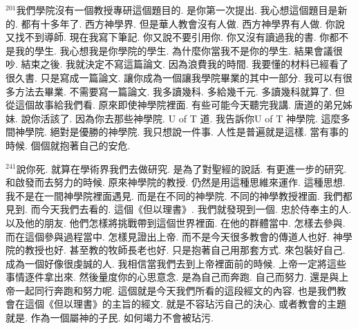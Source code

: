 \documentclass{book}
\begin{document}
$^{201}$我們學院沒有一個教授專研這個題目的.
是你第一次提出.
我心想這個題目是新的.
都有十多年了.
西方神學界.
但是華人教會沒有人做.
西方神學界有人做.
你說又找不到導師.
現在我寫下筆記.
你又說不要引用你.
你又沒有讀過我的書.
你都不是我的學生.
我心想我是你學院的學生.
為什麼你當我不是你的學生.
結果會議很吵.
結束之後.
我就決定不寫這篇論文.
因為浪費我的時間.
我要懂的材料已經看了很久書.
只是寫成一篇論文.
讓你成為一個讓我學院畢業的其中一部分.
我可以有很多方法去畢業.
不需要寫一篇論文.
我多讀幾科.
多給幾千元.
多讀幾科就算了.
但從這個故事給我們看.
原來即使神學院裡面.
有些可能今天聽完我講.
唐道的弟兄姊妹.
說你活該了.
因為你去那些神學院.
U of T 道.
我告訴你U of T 神學院.
這麼多間神學院.
絕對是優勝的神學院.
我只想說一件事.
人性是普遍就是這樣.
當有事的時候.
個個就抱著自己的安危.

$^{241}$說你死.
就算在學術界我們去做研究.
是為了對聖經的說話.
有更進一步的研究.
和啟發而去努力的時候.
原來神學院的教授.
仍然是用這種思維來運作.
這種思想.
我不是在一間神學院裡面遇見.
而是在不同的神學院.
不同的神學教授裡面.
我們都見到.
而今天我們去看的.
這個《但以理書》.
我們就發現到一個.
忠於侍奉主的人.
以及他的朋友.
他們怎樣將挑戰帶到這個世界裡面.
在他的群體當中.
怎樣去參與.
而在這個參與過程當中.
怎樣見證出上帝.
而不是今天很多教會的傳道人也好.
神學院的教授也好.
甚至教的牧師長老也好.
只是抱著自己用那套方式.
來包裝好自己.
成為一個好像很虔誠的人.
我相信當我們去到上帝裡面前的時候.
上帝一定將這些事情逐件拿出來.
然後量度你的心思意念.
是為自己而奔跑.
自己而努力.
還是與上帝一起同行奔跑和努力呢.
這個就是今天我們所看的這段經文的內容.
也是我們教會在這個《但以理書》的主旨的經文.
就是不容玷污自己的決心.
或者教會的主題就是.
作為一個屬神的子民.
如何竭力不會被玷污.
\end{document}
